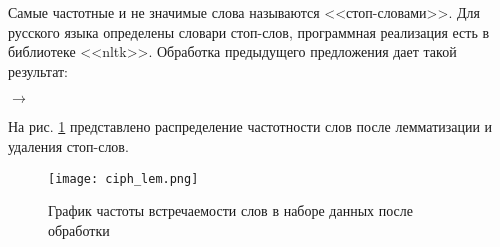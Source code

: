 \bigskip
Самые частотные и не значимые слова называются <<стоп-словами>>. Для русского языка определены словари стоп-слов, программная реализация есть в библиотеке <<nltk>>. Обработка предыдущего предложения дает такой результат:

\bigskip
{} $\to$ 

\bigskip\noindent
На рис. \ref{fig:ciph_lem} представлено  распределение частотности слов после лемматизации и удаления стоп-слов.

\begin{figure}[ht]
    \centering
    \texttt{[image: ciph\_lem.png]}
    \caption{График частоты встречаемости слов в наборе данных после обработки}
    \label{fig:ciph_lem}
\end{figure}




